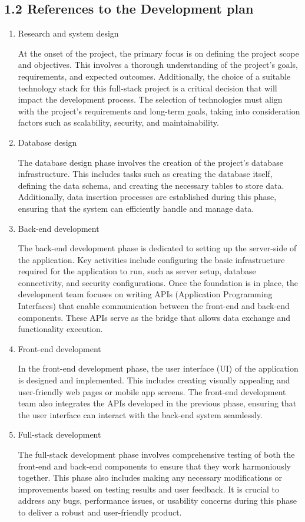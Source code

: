 \subsection{1.2 References to the Development plan}
 \begin{enumerate}
     \item Research and system design


At the onset of the project, the primary focus is on defining the project scope and objectives. This involves a thorough understanding of the project's goals, requirements, and expected outcomes. Additionally, the choice of a suitable technology stack for this full-stack project is a critical decision that will impact the development process. The selection of technologies must align with the project's requirements and long-term goals, taking into consideration factors such as scalability, security, and maintainability.

\item Database design

The database design phase involves the creation of the project's database infrastructure. This includes tasks such as creating the database itself, defining the data schema, and creating the necessary tables to store data. Additionally, data insertion processes are established during this phase, ensuring that the system can efficiently handle and manage data.

\item Back-end development

The back-end development phase is dedicated to setting up the server-side of the application. Key activities include configuring the basic infrastructure required for the application to run, such as server setup, database connectivity, and security configurations. Once the foundation is in place, the development team focuses on writing APIs (Application Programming Interfaces) that enable communication between the front-end and back-end components. These APIs serve as the bridge that allows data exchange and functionality execution.

\item Front-end development

In the front-end development phase, the user interface (UI) of the application is designed and implemented. This includes creating visually appealing and user-friendly web pages or mobile app screens. The front-end development team also integrates the APIs developed in the previous phase, ensuring that the user interface can interact with the back-end system seamlessly. 

\item Full-stack development

The full-stack development phase involves comprehensive testing of both the front-end and back-end components to ensure that they work harmoniously together. This phase also includes making any necessary modifications or improvements based on testing results and user feedback. It is crucial to address any bugs, performance issues, or usability concerns during this phase to deliver a robust and user-friendly product.

 \end{enumerate}